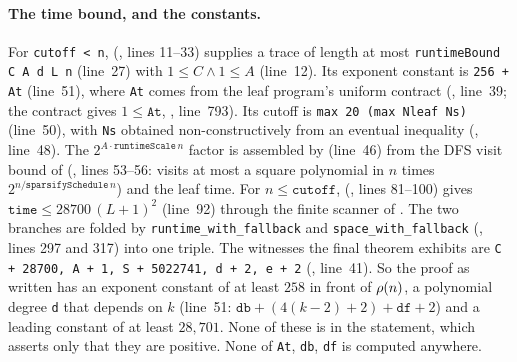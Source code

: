 \paragraph{The time bound, and the constants.} For \texttt{cutoff < n},
 (,
lines 11--33) supplies a trace of length at most
\texttt{runtimeBound C A d L n} (line~27) with $1 \le C \wedge 1 \le A$
(line~12). Its exponent constant is \texttt{256 + At} (line~51), where
\texttt{At} comes from the leaf program's uniform contract
(, line~39; the contract
gives $1 \le \mathtt{At}$, ,
line~793). Its cutoff is \texttt{max 20 (max Nleaf Ns)} (line~50),
with \texttt{Ns} obtained non-constructively from an eventual inequality
(, line~48). The $2^{A\cdot\mathtt{runtimeScale}\,n}$
factor is assembled by  (line~46)
from the DFS visit bound of 
(, lines 53--56: visits at most
a square polynomial in $n$ times $2^{n/\mathtt{sparsifySchedule}\,n}$)
and the leaf time. For $n \le \mathtt{cutoff}$,
(, lines 81--100) gives
$\mathtt{time} \le 28700\,(L+1)^2$ (line~92) through the finite scanner
of . The two branches are
folded by \texttt{runtime\_with\_fallback} and
\texttt{space\_with\_fallback}
(, lines 297 and 317)
into one triple. The witnesses the final theorem exhibits are
\texttt{C + 28700, A + 1, S + 5022741, d + 2, e + 2}
(, line~41). So the proof as written
has an exponent constant of at least $258$ in front of $\rho(n)$, a
polynomial degree \texttt{d} that depends on $k$ (line~51: $\mathtt{db} + (4(k-2)+2) + \mathtt{df} + 2$) and a leading constant of at least
$28{,}701$. None of these is in the statement, which asserts only that
they are positive. None of \texttt{At}, \texttt{db}, \texttt{df} is
computed anywhere.

